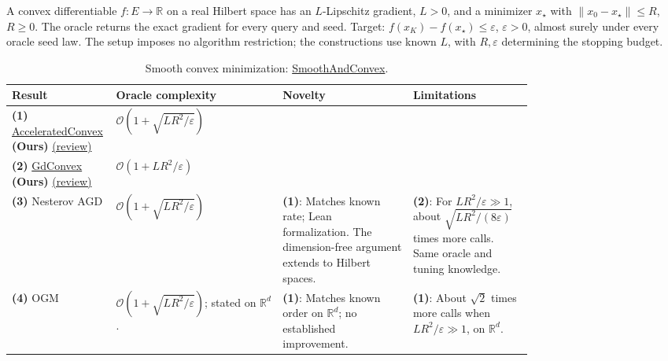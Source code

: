 \begin{table}[tp]
\centering
\caption{Smooth convex minimization: \href{https://github.com/k3nfalt/longtails/blob/main/LongTails/Setups/SmoothAndConvex.lean}{SmoothAndConvex}.}\label{tab:SmoothAndConvex}
\parbox{\linewidth}{\footnotesize A convex differentiable $f:E\to\mathbb R$ on a real Hilbert space has an $L$-Lipschitz gradient, $L>0$, and a minimizer $x_\star$ with $\|x_0-x_\star\|\le R$, $R\ge0$. The oracle returns the exact gradient for every query and seed. Target: $f(x_K)-f(x_\star)\le\varepsilon$, $\varepsilon>0$, almost surely under every oracle seed law. The setup imposes no algorithm restriction; the constructions use known $L$, with $R,\varepsilon$ determining the stopping budget.}\par\smallskip
\begin{threeparttable}
\footnotesize
\setlength{\tabcolsep}{4pt}\renewcommand{\arraystretch}{1.25}
\begin{tabularx}{\linewidth}{@{}>{\raggedright\arraybackslash}p{0.20\linewidth}>{\raggedright\arraybackslash}p{0.32\linewidth}>{\raggedright\arraybackslash}p{0.25\linewidth}>{\raggedright\arraybackslash}X@{}}
\toprule
\textbf{Result} & \textbf{Oracle complexity} & \textbf{Novelty} & \textbf{Limitations} \\
\midrule
\textbf{(1)} \href{https://github.com/k3nfalt/longtails/blob/main/LongTails/Theorems/AcceleratedConvex.lean}{Accelerated\allowbreak Convex} \textbf{(Ours)} \href{https://github.com/k3nfalt/longtails/blob/main/scripts/reviews/AcceleratedConvex.md}{(review)} & $\mathcal{O}\!\left(1+\sqrt{LR^2/\varepsilon}\right)$ & & \\
\midrule
\textbf{(2)} \href{https://github.com/k3nfalt/longtails/blob/main/LongTails/Theorems/GdConvex.lean}{Gd\allowbreak Convex} \textbf{(Ours)} \href{https://github.com/k3nfalt/longtails/blob/main/scripts/reviews/GdConvex.md}{(review)} & $\mathcal{O}(1+LR^2/\varepsilon)$ & & \\
\midrule[1.2pt]
\textbf{(3)} Nesterov AGD \citep[Cor.~4.9]{scAST2024v4} & $\mathcal{O}\!\left(1+\sqrt{LR^2/\varepsilon}\right)$ & \textbf{(1)}: Matches known rate; Lean formalization. The dimension-free argument extends to Hilbert spaces. & \textbf{(2)}: For $LR^2/\varepsilon\gg1$, about $\sqrt{LR^2/(8\varepsilon)}$ times more calls. Same oracle and tuning knowledge. \\
\midrule
\textbf{(4)} OGM \citep[Cor.~4.6]{scAST2024v4} & $\mathcal{O}\!\left(1+\sqrt{LR^2/\varepsilon}\right)$; stated on $\mathbb R^d$. & \textbf{(1)}: Matches known order on $\mathbb R^d$; no established improvement. & \textbf{(1)}: About $\sqrt2$ times more calls when $LR^2/\varepsilon\gg1$, on $\mathbb R^d$. \\

\end{tabularx}
\end{threeparttable}
\end{table}
